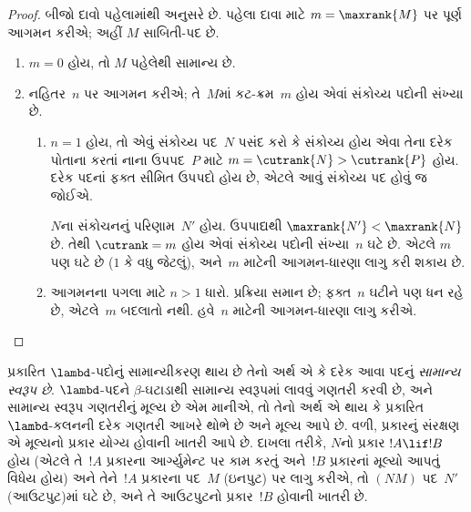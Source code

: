 \begin{proof}
  બીજો દાવો પહેલામાંથી અનુસરે છે. પહેલા દાવા માટે
  $m=\maxrank{M}$ પર પૂર્ણ આગમન કરીએ; અહીં $M$
  સાબિતી-પદ છે.
  \begin{enumerate}

  \item $m=0$ હોય, તો $M$ પહેલેથી સામાન્ય છે.
  \item
    નહિતર~$n$ પર આગમન કરીએ; તે~$M$માં
    કટ-ક્રમ~$m$ હોય એવાં સંકોચ્ય પદોની સંખ્યા છે.
    \begin{enumerate}
    \item $n=1$ હોય, તો એવું સંકોચ્ય પદ~$N$ પસંદ કરો
      કે સંકોચ્ય હોય એવા તેના દરેક પોતાના કરતાં
      નાના ઉપપદ~$P$ માટે $m = \cutrank{N} > \cutrank{P}$
      હોય. દરેક પદનાં ફક્ત સીમિત ઉપપદો હોય છે,
      એટલે આવું સંકોચ્ય પદ હોવું જ જોઈએ.

      $N$ના સંકોચનનું પરિણામ~$N'$ હોય.
      ઉપપાદ્યથી $\maxrank{N'} < \maxrank{N}$ છે.
      તેથી $\cutrank=m$ હોય એવાં સંકોચ્ય પદોની
      સંખ્યા~$n$ ઘટે છે. એટલે $m$ પણ ઘટે છે
      ($1$ કે વધુ જેટલું), અને~$m$ માટેની
      આગમન-ધારણા લાગુ કરી શકાય છે.
    \item આગમનના પગલા માટે $n>1$ ધારો.
      પ્રક્રિયા સમાન છે; ફક્ત~$n$ ઘટીને પણ ધન
      રહે છે, એટલે~$m$ બદલાતો નથી.
      હવે~$n$ માટેની આગમન-ધારણા લાગુ કરીએ.
    \end{enumerate}
\end{enumerate}
\end{proof}

પ્રકારિત $\lambd$-પદોનું સામાન્યીકરણ થાય છે તેનો
અર્થ એ કે દરેક આવા પદનું \emph{સામાન્ય સ્વરૂપ છે}.
$\lambd$-પદને $\beta$-ઘટાડાથી સામાન્ય સ્વરૂપમાં
લાવવું ગણતરી કરવી છે, અને સામાન્ય સ્વરૂપ
ગણતરીનું મૂલ્ય છે એમ માનીએ, તો તેનો અર્થ
એ થાય કે પ્રકારિત $\lambd$-કલનની દરેક ગણતરી
આખરે થોભે છે અને મૂલ્ય આપે છે. વળી,
પ્રકારનું સંરક્ષણ એ મૂલ્યનો પ્રકાર યોગ્ય
હોવાની ખાતરી આપે છે. દાખલા તરીકે, $N$નો
પ્રકાર $!A \lif !B$ હોય (એટલે તે~$!A$
પ્રકારના આર્ગ્યુમેન્ટ પર કામ કરતું અને~$!B$
પ્રકારનાં મૂલ્યો આપતું વિધેય હોય) અને તેને~$!A$
પ્રકારના પદ~$M$ (ઇનપુટ) પર લાગુ કરીએ,
તો $(NM)$ પદ~$N'$ (આઉટપુટ)માં ઘટે છે,
અને તે આઉટપુટનો પ્રકાર~$!B$ હોવાની ખાતરી છે.

